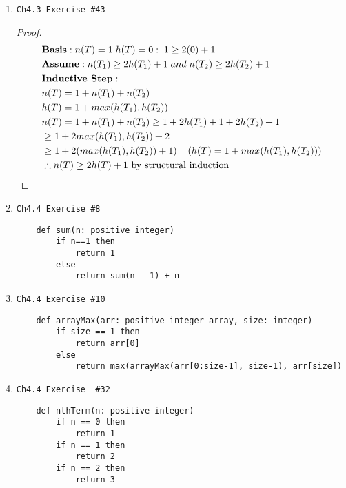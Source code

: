 \documentclass[11pt]{article}
\begin{document}
\begin{enumerate}
    \newpage

    \item \begin{verbatim}Ch4.3 Exercise #43\end{verbatim}
        \begin{proof}
            \begin{align*}
                & \textbf{Basis}: n(T) = 1\; h(T) = 0 :\; 1 \ge 2(0) + 1 \\
                & \textbf{Assume}: n(T_1)\ge 2h(T_1)+1\;and\;n(T_2)\ge 2h(T_2)+1 \\
                & \textbf{Inductive Step}: \\
                & n(T) = 1 + n(T_1) + n(T_2) \\
                & h(T) = 1 + max(h(T_1), h(T_2)) \\
                & n(T) = 1 + n(T_1) + n(T_2) \ge 1 + 2h(T_1)+1+2h(T_2) + 1\\
                & \ge 1 + 2max(h(T_1), h(T_2)) + 2 \\
                & \ge 1 + 2(max(h(T_1), h(T_2)) + 1) \;\;\;\; \text{$(h(T) = 1 + max(h(T_1), h(T_2)))$} \\
                & \therefore n(T) \ge 2h(T) + 1 \text{ by structural induction} \qedhere
            \end{align*}
        \end{proof}
    
    \item \begin{verbatim}Ch4.4 Exercise #8\end{verbatim}
        \begin{verbatim}
    def sum(n: positive integer)
        if n==1 then
            return 1
        else
            return sum(n - 1) + n
        \end{verbatim}

    \item \begin{verbatim}Ch4.4 Exercise #10\end{verbatim}
        \begin{verbatim}
    def arrayMax(arr: positive integer array, size: integer)
        if size == 1 then
            return arr[0]
        else
            return max(arrayMax(arr[0:size-1], size-1), arr[size])
        \end{verbatim}
    
    \newpage

    \item \begin{verbatim}Ch4.4 Exercise  #32\end{verbatim}
        \begin{verbatim}
    def nthTerm(n: positive integer)
        if n == 0 then
            return 1
        if n == 1 then
            return 2
        if n == 2 then
            return 3
        

\end{verbatim}
\end{enumerate}
\end{document}
